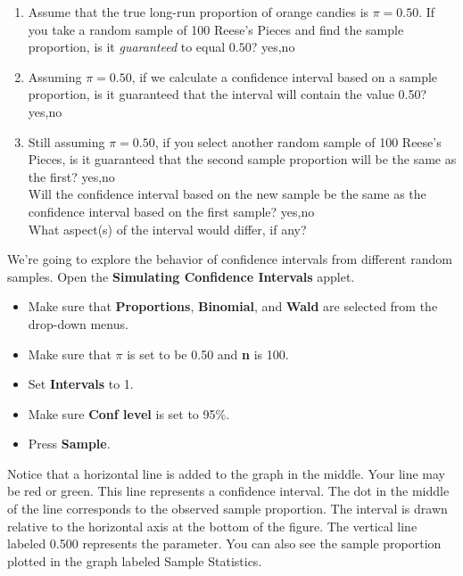 \documentclass{amsart}
\begin{document}
\begin{Form}
\begin{enumerate}
\item Assume that the true long-run proportion of orange candies is $\pi = 0.50$. If you take a random sample of 100 Reese's Pieces and find the sample proportion, is it \emph{guaranteed} to equal $0.50$?
\ChoiceMenu[combo,name=q1,width=1.5cm,charsize=14pt]{\mbox{}}
{yes,no} 

\bigskip

\item Assuming $\pi=0.50$, if we calculate a confidence interval based on a sample proportion, is it guaranteed that the interval will contain the value 0.50? \ChoiceMenu[combo,name=q2,width=1.5cm,charsize=14pt]{\mbox{}}
{yes,no} 

\bigskip

\item Still assuming $\pi=0.50$, if you select another random sample of 100 Reese's Pieces, is it guaranteed that the second sample proportion will be the same as the first? \ChoiceMenu[combo,name=q3a,width=1.5cm,charsize=14pt]{\mbox{}}
{yes,no} \\



\noindent Will the confidence interval based on the new sample be the same as the confidence interval based on the first sample? \ChoiceMenu[combo,name=q3b,width=1.5cm,charsize=14pt]{\mbox{}}
{yes,no} \\


\noindent What aspect(s) of the interval would differ, if any?
\TextField[name=q3c,width=0.4\textwidth]{}
\bigskip
\end{enumerate}

\noindent We're going to explore the behavior of confidence intervals from different random samples. Open the {\bf Simulating Confidence Intervals} applet. 
\begin{itemize}
\item Make sure that {\bf Proportions}, {\bf Binomial}, and {\bf Wald} are selected from the drop-down menus.
\item Make sure that $\pi$ is set to be 0.50 and {\bf n} is 100.
\item Set {\bf Intervals} to 1.
\item Make sure {\bf Conf level} is set to 95\%.
\item Press {\bf Sample}.
\end{itemize}
\bigskip

\noindent Notice that a horizontal line is added to the graph in the middle. Your line may be red or green. This line represents a confidence interval. The dot in the middle of the line corresponds to the observed sample proportion. The interval is drawn relative to the horizontal axis at the bottom of the figure. The vertical line labeled 0.500 represents the parameter. You can also see the sample proportion plotted in the graph labeled Sample Statistics. 
\smallskip


\end{Form}
\end{document}
